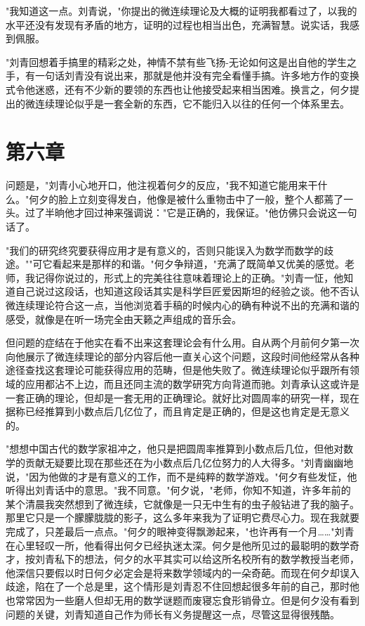 \documentclass[UTF8]{ctexart}
\begin{document}
"我知道这一点。刘青说，"你提出的微连续理论及大概的证明我都看过了，以我的水平还没有发现有矛盾的地方，证明的过程也相当出色，充满智慧。说实话，我感到佩服。

"刘青回想着手搞里的精彩之处，神情不禁有些飞扬-无论如何这是出自他的学生之手，有一句话刘青没有说出来，那就是他并没有完全看懂手搞。许多地方作的变换式令他迷惑，还有不少新的要领的东西也让他接受起来相当困难。换言之，何夕提出的微连续理论似乎是一套全新的东西，它不能归入以往的任何一个体系里去。
\clearpage

\section*{第六章}

问题是，"刘青小心地开口，他注视着何夕的反应，"我不知道它能用来干什么。"何夕的脸上立刻变得发白，他像是被什么重物击中了一般，整个人都蔫了一头。过了半晌他才回过神来强调说："它是正确的，我保证。"他仿佛只会说这一句话了。

"我们的研究终究要获得应用才是有意义的，否则只能误入为数学而数学的歧途。""可它看起来是那样的和谐。"何夕争辩道，"充满了既简单又优美的感觉。老师，我记得你说过的，形式上的完美往往意味着理论上的正确。"刘青一怔，他知道自己说过这段话，也知道这段话其实是科学巨匠爱因斯坦的经验之谈。他不否认微连续理论符合这一点，当他浏览着手稿的时候内心的确有种说不出的充满和谐的感受，就像是在听一场完全由天籁之声组成的音乐会。

但问题的症结在于他实在看不出来这套理论会有什么用。自从两个月前何夕第一次向他展示了微连续理论的部分内容后他一直关心这个问题，这段时间他经常从各种途径查找这套理论可能获得应用的范畴，但是他失败了。微连续理论似乎跟所有领域的应用都沾不上边，而且还同主流的数学研究方向背道而驰。刘青承认这或许是一套正确的理论，但却是一套无用的正确理论。就好比对圆周率的研究一样，现在据称已经推算到小数点后几亿位了，而且肯定是正确的，但是这也肯定是无意义的。

"想想中国古代的数学家祖冲之，他只是把圆周率推算到小数点后几位，但他对数学的贡献无疑要比现在那些还在为小数点后几亿位努力的人大得多。"刘青幽幽地说，"因为他做的才是有意义的工作，而不是纯粹的数学游戏。"何夕有些发怔，他听得出刘青话中的意思。"我不同意。"何夕说，"老师，你知不知道，许多年前的某个清晨我突然想到了微连续，它就像是一只无中生有的虫子般钻进了我的脑子。那里它只是一个朦朦胧胧的影子，这么多年来我为了证明它费尽心力。现在我就要完成了，只差最后一点点。"何夕的眼神变得飘渺起来，"也许再有一个月……"刘青在心里轻叹一所，他看得出何夕已经执迷太深。何夕是他所见过的最聪明的数学奇才，按刘青私下的想法，何夕的水平其实可以给这所名校所有的数学教授当老师，他深信只要假以时日何夕必定会是将来数学领域内的一朵奇葩。而现在何夕却误入歧途，陷在了一个总是里，这个情形是刘青忍不住回想起很多年前的自己，那时他也常常因为一些磨人但却无用的数学谜题而废寝忘食形销骨立。但是何夕没有看到问题的关键，刘青知道自己作为师长有义务提醒这一点，尽管这显得很残酷。
\end{document}
